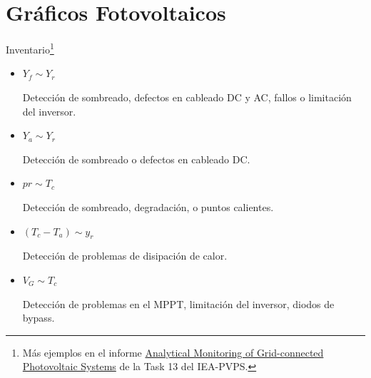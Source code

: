 \documentclass[aspectratio=169, usenames,svgnames,dvipsnames]{beamer}
\begin{document}
\section{Gráficos Fotovoltaicos}
\label{sec:org5fc9725}

\begin{frame}[label={sec:org305351d}]{Inventario\footnote{Más ejemplos en el informe \guillemotleft{}\href{https://iea-pvps.org/key-topics/analytical-monitoring-of-pv-systems-final/}{Analytical Monitoring of Grid-connected Photovoltaic Systems}\guillemotright{} de la Task 13 del IEA-PVPS.}}
\begin{itemize}
\item \(Y_f \sim Y_r\) 

Detección de sombreado, defectos en cableado DC y AC, fallos o limitación del inversor.

\item \(Y_a \sim Y_r\)

Detección de sombreado o defectos en cableado DC.

\item \(pr \sim T_c\) 

Detección de sombreado, degradación, o puntos calientes.

\item \((T_c - T_a) \sim y_r\)

Detección de problemas de disipación de calor.

\item \(V_G \sim T_c\)

Detección de problemas en el MPPT, limitación del inversor, diodos de bypass.
\end{itemize}
\end{frame}
\end{document}
